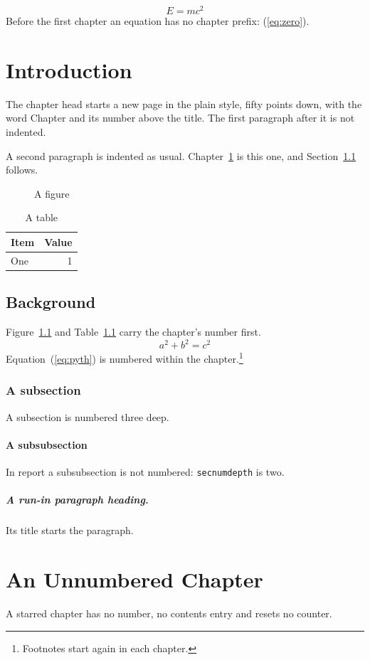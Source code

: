 \documentclass[11pt]{report}
\begin{document}
\begin{equation}E = mc^2\label{eq:zero}\end{equation}
Before the first chapter an equation has no chapter prefix: (\ref{eq:zero}).
\chapter{Introduction}\label{ch:intro}
The chapter head starts a new page in the plain style, fifty points down, with the word
Chapter and its number above the title. The first paragraph after it is not indented.

A second paragraph is indented as usual. Chapter~\ref{ch:intro} is this one, and
Section~\ref{sec:bg} follows.
\begin{figure}[t]\centering{}\caption{A figure}\label{fig:a}\end{figure}
\begin{table}[b]\centering\begin{tabular}{|l|r|}\hline Item & Value\\\hline One & 1\\\hline\end{tabular}\caption{A table}\label{tab:a}\end{table}
\section{Background}\label{sec:bg}
Figure~\ref{fig:a} and Table~\ref{tab:a} carry the chapter's number first.
\begin{equation}a^2 + b^2 = c^2\label{eq:pyth}\end{equation}
Equation~(\ref{eq:pyth}) is numbered within the chapter.\footnote{Footnotes start again in each chapter.}
\subsection{A subsection}
A subsection is numbered three deep.
\subsubsection{A subsubsection}
In report a subsubsection is not numbered: \texttt{secnumdepth} is two.
\paragraph{A run-in paragraph heading.} Its title starts the paragraph.
\chapter*{An Unnumbered Chapter}
A starred chapter has no number, no contents entry and resets no counter.
\end{document}
